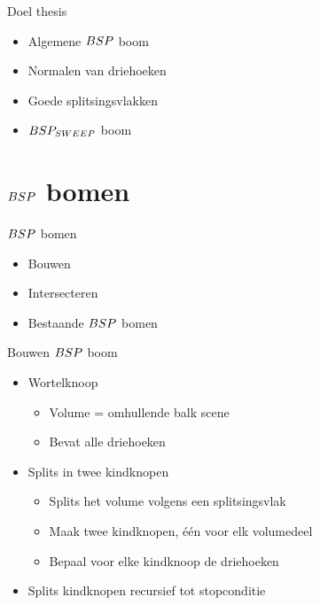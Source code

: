 \documentclass[11pt,t]{beamer}
\begin{document}
\begin{frame}{Doel thesis}
	\begin{itemize}
		\item Algemene $BSP$ boom
		\item Normalen van driehoeken
		\item Goede splitsingsvlakken
	\end{itemize}
	\vspace{10pt}
	\begin{itemize}
		\item $BSP_{SWEEP}$ boom
	\end{itemize} 
\end{frame}


 \section{$BSP$ bomen}

 \begin{frame}{$BSP$ bomen}
	\begin{itemize}
		\item Bouwen
		\item Intersecteren
		\item Bestaande $BSP$ bomen
	\end{itemize}
\end{frame}

\begin{frame}{Bouwen $BSP$ boom}
	\begin{itemize}
		\item Wortelknoop
		\begin{itemize}
			\item Volume = omhullende balk scene
			\item Bevat alle driehoeken
		\end{itemize}
		\item Splits in twee kindknopen
		\begin{itemize}
			\item Splits het volume volgens een splitsingsvlak
			\item Maak twee kindknopen, één voor elk volumedeel
			\item Bepaal voor elke kindknoop de driehoeken
		\end{itemize}
		\item Splits kindknopen recursief tot stopconditie
	\end{itemize}
\end{frame}
\end{document}

